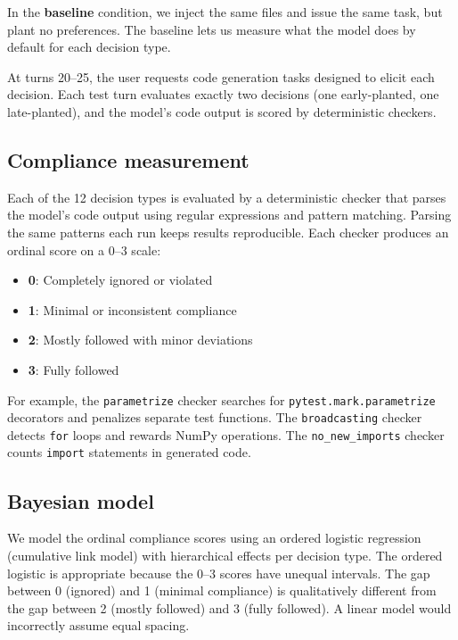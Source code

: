 \documentclass[a4paper]{llncs}
\begin{document}
In the \textbf{baseline} condition, we inject the same files and issue the same task, but plant no
preferences. The baseline lets us measure what the model does
by default for each decision type.

At turns 20--25, the user requests code generation tasks designed to
elicit each decision. Each test turn evaluates exactly two decisions
(one early-planted, one late-planted), and the model's code output is
scored by deterministic checkers.

\subsection{Compliance measurement}
\label{sec:measurement}

Each of the 12 decision types is evaluated by a deterministic checker
that parses the model's code output using regular expressions and
pattern matching. Parsing the same patterns each run keeps results reproducible. Each checker produces
an ordinal score on a 0--3 scale:

\begin{itemize}
  \item \textbf{0}: Completely ignored or violated
  \item \textbf{1}: Minimal or inconsistent compliance
  \item \textbf{2}: Mostly followed with minor deviations
  \item \textbf{3}: Fully followed
\end{itemize}

\begin{sloppypar}
For example, the \texttt{parametrize} checker searches for
\texttt{pytest.mark.parametrize} decorators and penalizes separate
test functions. The \texttt{broadcasting} checker detects
\texttt{for} loops and rewards NumPy operations. The
\texttt{no\_new\_imports} checker counts \texttt{import} statements
in generated code.
\end{sloppypar}

\subsection{Bayesian model}
\label{sec:bayesian-model}

We model the ordinal compliance scores using an ordered logistic
regression (cumulative link model) with hierarchical effects per
decision type. The ordered logistic is appropriate because the 0--3
scores have unequal intervals. The gap between 0 (ignored) and 1
(minimal compliance) is qualitatively different from the gap between 2
(mostly followed) and 3 (fully followed). A linear model would
incorrectly assume equal spacing.
\end{document}
